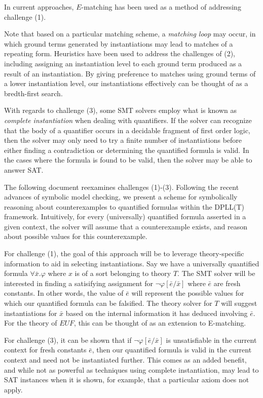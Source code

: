 \documentclass{llncs}
\begin{document}
In current approaches, $E$-matching has been used as a method of addressing challenge (1).


Note that based on a particular matching scheme, a \emph{matching loop} may occur, in which ground terms generated by instantiations may lead to matches of a repeating form.
Heuristics have been used to address the challenges of (2), including assigning an instantiation level to each ground term produced as a result of an instantiation.
By giving preference to matches using ground terms of a lower instantiation level, our instantiations effectively can be thought of as a bredth-first search.

With regards to challenge (3), some SMT solvers employ what is known as \emph{complete instantiation} when dealing with quantifiers.
If the solver can recognize that the body of a quantifier occurs in a decidable fragment of first order logic, then the solver may only need to try a finite number of instantiations before either finding a contradiction or determining the quantified formula is valid.
In the cases where the formula is found to be valid, then the solver may be able to answer SAT.

The following document reexamines challenges (1)-(3).
Following the recent advances of symbolic model checking, we present a scheme for symbolically reasoning about counterexamples to quantified formulas within the DPLL(T) framework.
Intuitively, for every (universally) quantified formula asserted in a given context, the solver will assume that a counterexample exists, and reason about possible values for this counterexample.

For challenge (1), the goal of this approach will be to leverage theory-specific information to aid in selecting instantiations.
Say we have a universally quantified formula $\forall \bar{x}. \varphi$ where $x$ is of a sort belonging to theory $T$.
The SMT solver will be interested in finding a satisifying assignment for $ \neg \varphi[\bar{e}/\bar{x}]$ where $\bar{e}$ are fresh constants.
In other words, the value of $\bar{e}$ will represent the possible values for which our quantified formula can be falsified.
The theory solver for $T$ will suggest instantiations for $\bar{x}$ based on the internal information it has deduced involving $\bar{e}$.
For the theory of $EUF$, this can be thought of as an extension to E-matching.

For challenge (3), it can be shown that if $\neg \varphi[\bar{e}/\bar{x}]$ is unsatisfiable in the current context for fresh constants $\bar{e}$, then our quantified formula is valid in the current context and need not be instantiated further.
This comes as an added benefit, and while not as powerful as techniques using complete instantiation, may lead to SAT instances when it is shown, for example, that a particular axiom does not apply.
\end{document}
